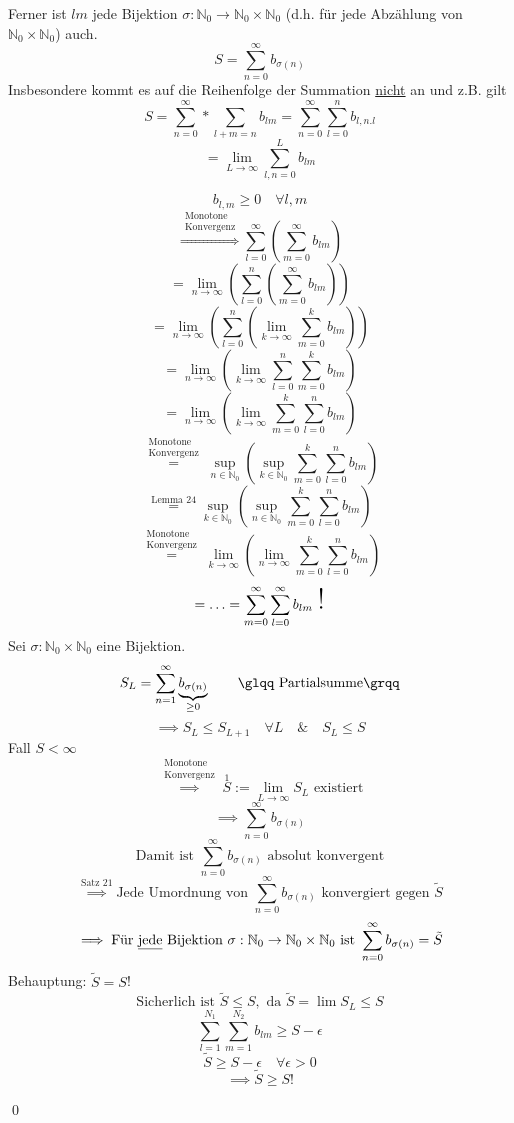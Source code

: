 \documentclass[fleqn]{scrbook}
\newcommand{\qq}[1]{\glqq #1\grqq}
\newcommand{\N}{\mathbb{N}}
\newcommand{\sumNI}{\sum_{n=0}^{\infty}}
\newcommand{\limN}[1][n]{\lim_{#1 \to \infty}}
\renewenvironment{proof}{{\bfseries Beweis }}{\qed}
\begin{document}
Ferner ist $lm$ jede Bijektion $\sigma: \N_0 \to \N_0 \times \N_0$ (d.h. für jede Abzählung von $\N_0 \times \N_0$) auch.
\[S= \sum_{n=0}^\infty b_{\sigma(n)}\]
Insbesondere kommt es auf die Reihenfolge der Summation \underline{nicht} an und z.B. gilt
\[S=\sum_{n=0}^\infty * \sum_{l+m=n} b_{lm} = \sum_{n=0}^\infty \sum_{l=0}^n b_{l,n.l}\]
\[= \lim_{L\to \infty} \sum_{l,n=0}^L b_{lm}\]

\begin{proof}

\[b_{l,m} \geq 0 \quad \forall l,m\]
\[\stackrel{\begin{array}{c}\text{Monotone}\\\text{Konvergenz}\end{array}}{\Longrightarrow} \sum_{l=0}^\infty  \left( \sum_{m=0}^\infty b_{lm} \right) \]
\[=\limN \left( \sum_{l=0}^n \left( \sum_{m=0}^\infty b_{lm} \right) \right)\]
\[=\limN \left( \sum_{l=0}^n \left( \limN[k] \sum_{m=0}^k b_{lm} \right) \right)\]
\[=\limN \left( \limN[k] \sum_{l=0}^n \sum_{m=0}^k b_{lm} \right)\]
\[=\limN \left( \limN[k] \sum_{m=0}^k \sum_{l=0}^n b_{lm} \right)\]
\[\stackrel{\begin{array}{c}\text{Monotone}\\\text{Konvergenz}\end{array}}{=}\sup_{n \in \N_0} \left( \sup_{k \in \N_0} \sum_{m=0}^k \sum_{l=0}^n b_{lm} \right)\]
\[\stackrel{\text{Lemma 24}}{=}\sup_{k \in \N_0} \left( \sup_{n \in \N_0} \sum_{m=0}^k \sum_{l=0}^n b_{lm} \right)\]
\[\stackrel{\begin{array}{c}\text{Monotone}\\\text{Konvergenz}\end{array}}{=}\limN[k] \left( \limN[n] \sum_{m=0}^k \sum_{l=0}^n b_{lm} \right)\]
\[=\ldots=\sum_{m=0}^\infty \sum_{l=0}^\infty b_{lm} \text{ \huge !}\]
Sei $\sigma: \N_0 \times \N_0$ eine Bijektion.
\[S_L = \sum_{n=1}^\infty \underbrace{b_{\sigma(n)}}_{\geq 0} \qquad  \text{\qq{Partialsumme}}\]
\[\implies S_L \leq S_{L+1} \quad \forall L \quad \& \quad \boxed{S_L \leq S}\]
Fall $ S < \infty $
\[\stackrel{\begin{array}{c}\text{Monotone}\\\text{Konvergenz}\end{array}}{\implies}\stackrel{1}{S} := \lim_{L \to \infty} S_L \text{ existiert}\]
\[\implies \sum_{n=0}^\infty b_{\sigma(n)}\]
\[\text{Damit ist } \sumNI b_{\sigma(n)} \text{ absolut konvergent}\]
\[\stackrel{\text{Satz 21}}{\implies} \text{Jede Umordnung von } \sumNI b_{\sigma(n)} \text{ konvergiert gegen } \tilde{S}\]
\[\implies \text{Für \underline{jede} Bijektion } \sigma: \N_0 \to \N_0 \times \N_0 \text{ ist } \sumNI b_{\sigma(n)} = \tilde{S}\]
Behauptung: $\tilde{S} = S$!
\[\text{Sicherlich ist } \tilde{S} \leq S, \text{ da } \tilde{S}= \lim S_L \leq S\]
\[\sum_{l=1}^{N_1} \sum_{m=1}^{N_2} b_{lm} \geq S-\epsilon\]
\[\tilde{S} \geq S-\epsilon \quad \forall \epsilon > 0\]
\[\implies \tilde{S} \geq S !\]

\end{proof}
\end{document}
